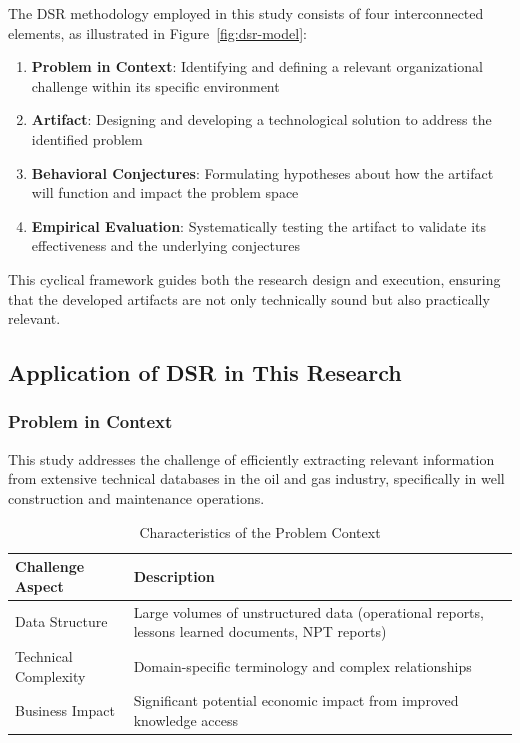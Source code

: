         The DSR methodology employed in this study consists of four interconnected elements, as illustrated in Figure~\ref{fig:dsr-model}:
        
        \begin{enumerate}
        \item \textbf{Problem in Context}: Identifying and defining a relevant organizational challenge within its specific environment
        \item \textbf{Artifact}: Designing and developing a technological solution to address the identified problem
        \item \textbf{Behavioral Conjectures}: Formulating hypotheses about how the artifact will function and impact the problem space
        \item \textbf{Empirical Evaluation}: Systematically testing the artifact to validate its effectiveness and the underlying conjectures
        \end{enumerate}
        
        This cyclical framework guides both the research design and execution, ensuring that the developed artifacts are not only technically sound but also practically relevant.
    
    \subsection{Application of DSR in This Research} \label{sec:dsr-application}
        
        \subsubsection{Problem in Context}
        
        This study addresses the challenge of efficiently extracting relevant information from extensive technical databases in the oil and gas industry, specifically in well construction and maintenance operations. 
        
        \begin{table}[h]
            \centering
            \caption{Characteristics of the Problem Context}
            \begin{tabular}{|p{}|p{}|}
            \hline
            \textbf{Challenge Aspect} & \textbf{Description} \\
            \hline
            Data Structure & Large volumes of unstructured data (operational reports, lessons learned documents, NPT reports) \\
            \hline
            Technical Complexity & Domain-specific terminology and complex relationships \\
            \hline
            Business Impact & Significant potential economic impact from improved knowledge access \\
            \hline
            \end{tabular}
            \label{tab:problem-context}
        \end{table}
        
